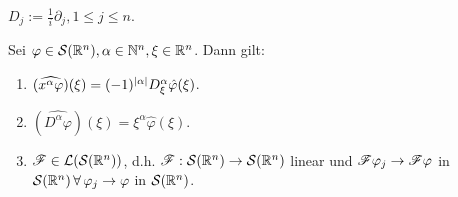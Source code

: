 \begin{notation}
$D_j := \frac 1 i \partial_j , 1 \leq j \leq n$.
\end{notation}

\begin{satz}
\label{satz:8.5}
Sei $\varphi \in \mathcal S(\mathbb{R}^n), \alpha \in \mathbb{N}^n, \xi \in \mathbb{R}^n$. Dann gilt:
\begin{enumerate}[\rm(a)]
\item $(\widehat{ x^\alpha \varphi})(\xi) = (-1)^{\lvert \alpha\rvert} D^\alpha_\xi \hat \varphi (\xi)$.
\item $(\widehat{D^{\alpha} \varphi})(\xi) = \xi^\alpha \hat\varphi(\xi)$.
\item $\mathscr{F}\in \mathcal L(\mathcal S(\mathbb{R}^n))$, d.h. $\mathscr{F}:\mathcal S(\mathbb{R}^n) \rightarrow \mathcal S(\mathbb{R}^n)$ linear und $\mathscr{F}\varphi_j \rightarrow \mathscr{F}\varphi$ in $\mathcal S(\mathbb{R}^n) \, \forall \, \varphi_j \rightarrow \varphi$ in $\mathcal S(\mathbb{R}^n)$.
\end{enumerate}
\end{satz}

